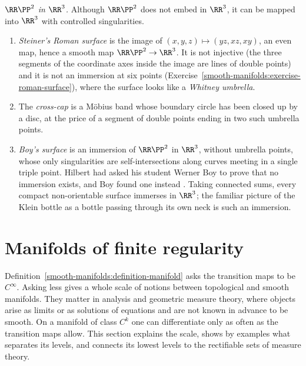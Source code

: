 \begin{remark}\label{smooth-manifolds:remark-rp2-r3}
\emph{$\RR\PP^2$ in $\RR^3$.} Although $\RR\PP^2$ does not embed in $\RR^3$, it can be mapped into $\RR^3$ with controlled singularities.
\begin{enumerate}
\item \emph{Steiner's Roman surface} is the image of $(x, y, z) \mapsto (yz, xz, xy)$, an even map, hence a smooth map $\RR\PP^2 \to \RR^3$. It is not injective (the three segments of the coordinate axes inside the image are
lines of double points) and it is not an immersion at six points (Exercise~\ref{smooth-manifolds:exercise-roman-surface}), where the surface looks like a \emph{Whitney umbrella}.
\item The \emph{cross-cap} is a M\"obius band whose boundary circle has been closed up by a disc, at the price of a segment of double points ending in two such umbrella points.
\item \emph{Boy's surface} is an immersion of $\RR\PP^2$ in $\RR^3$, without umbrella points, whose only singularities are self-intersections along curves meeting in a single triple point. Hilbert had asked his student Werner Boy
to prove that no immersion exists, and Boy found one instead \cite{boy-1903}. Taking connected sums, every compact non-orientable surface immerses in $\RR^3$; the familiar picture of the Klein bottle as a bottle passing
through its own neck is such an immersion.
\end{enumerate}
\end{remark}

\section{Manifolds of finite regularity}\label{smooth-manifolds:section-regularity}

Definition~\ref{smooth-manifolds:definition-manifold} asks the transition maps to be $C^\infty$. Asking less gives a whole scale of notions between topological and smooth manifolds. They matter in analysis
and geometric measure theory, where objects arise as limits or as solutions of equations and are not known in advance to be smooth. On a manifold of class $C^k$ one can differentiate only as often as the
transition maps allow. This section explains the scale, shows by examples what separates its levels, and connects its lowest levels to the rectifiable sets of measure theory.

